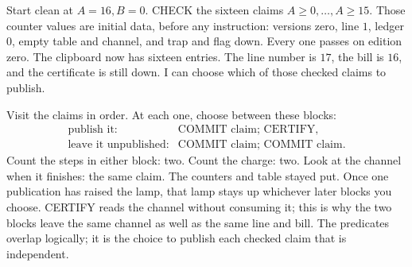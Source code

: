 \documentclass[11pt,twoside]{article}
\theoremstyle{thielethm}
\theoremstyle{thieledef}
\theoremstyle{thieledef}
\theoremstyle{thieledef}
\theoremstyle{thielethm}
\theoremstyle{thieleobs}
\theoremstyle{thielethm}
\begin{document}
Start clean at $A=16,B=0$. CHECK the sixteen claims $A\ge0,\ldots,A\ge15$.
Those counter values are initial data, before any instruction: versions zero,
line $1$, ledger $0$, empty table and channel, and trap and flag down.
Every one passes on edition zero. The clipboard now has sixteen entries. The line
number is $17$, the bill is $16$, and the certificate is still down. I can choose
which of those checked claims to publish.

Visit the claims in order. At each one, choose between these blocks:
\[
\begin{array}{ll}
\text{publish it:}&\text{COMMIT claim; CERTIFY},\\
\text{leave it unpublished:}&\text{COMMIT claim; COMMIT claim}.
\end{array}
\]
Count the steps in either block: two. Count the charge: two. Look at the channel when
it finishes: the same claim. The counters and table stayed put. Once one publication
has raised the lamp, that lamp stays up whichever later blocks you choose.
CERTIFY reads the channel without consuming it; this is why the two blocks
leave the same channel as well as the same line and bill.
The predicates overlap logically; it is the choice to publish each checked claim that is independent.
\end{document}

